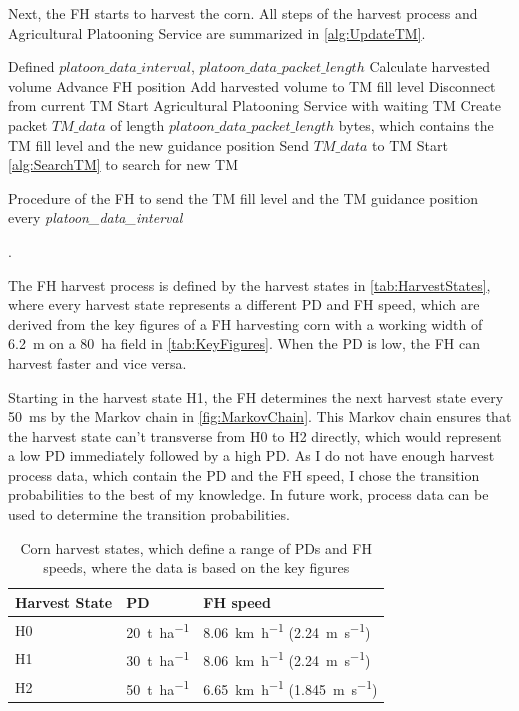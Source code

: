 Next, the \ac{FH} starts to harvest the corn.
All steps of the harvest process and Agricultural Platooning Service are summarized in
\autoref{alg:UpdateTM}.

\begin{algorithm}
\begin{algorithmic}[1]
\REQUIRE Defined $platoon\_data\_interval$, $platoon\_data\_packet\_length$
\STATE Calculate harvested volume
\STATE Advance \ac{FH} position
\STATE Add harvested volume to \ac{TM} fill level
    \STATE Disconnect from current \ac{TM}
	\STATE Start Agricultural Platooning Service with waiting \ac{TM}
\ELSE
	\STATE Create packet $TM\_data$ of length $platoon\_data\_packet\_length$ bytes, which contains the \ac{TM} fill level and the new guidance position
	\STATE Send $TM\_data$ to \ac{TM}
		\STATE Start \autoref{alg:SearchTM} to search for new \ac{TM}
	\ENDIF
\ENDIF
\end{algorithmic}
\caption{Procedure of the \acf{FH} to send the \acf{TM} fill level and the \ac{TM} guidance position every
\textit{platoon\_data\_interval}}.
\label{alg:UpdateTM}
\end{algorithm}

The FH harvest process is defined by the harvest states in \autoref{tab:HarvestStates},
where every harvest state represents a different \ac{PD} and \ac{FH} speed, which are derived from the key figures of a
\ac{FH} harvesting corn with a working width of \SI{6.2}{\meter} on a \SI{80}{\hectare} field in \autoref{tab:KeyFigures}.
When the \ac{PD} is low, the \ac{FH} can harvest faster and vice versa.

Starting in the harvest state H1, the \ac{FH} determines the next harvest state every \SI{50}{\milli\second}
by the Markov chain in \autoref{fig:MarkovChain}.
This Markov chain ensures that the harvest state can't transverse from H0 to H2 directly, which would represent
a low \ac{PD} immediately followed by a high \ac{PD}.
As I do not have enough harvest process data, which contain the \ac{PD} and the \ac{FH} speed,
I chose the transition probabilities to the best of my knowledge.
In future work, process data can be used to determine
the transition probabilities.

\begin{table}[H]
	\centering
	\begin{tabular}{>{\centering}p{2cm}p{4cm}p{4cm}}
		\toprule
		Harvest State & \ac{PD} & \ac{FH} speed\\
		\midrule
		H0 & \SI{20}{\tonne\per\hectare}
        & \SI{8.06}{\kilo\metre\per\hour} (\SI{2.24}{\metre\per\second}) \\
		H1 & \SI{30}{\tonne\per\hectare}
        & \SI{8.06}{\kilo\metre\per\hour} (\SI{2.24}{\metre\per\second}) \\
		H2 & \SI{50}{\tonne\per\hectare}
        & \SI{6.65}{\kilo\metre\per\hour} (\SI{1.845}{\metre\per\second}) \\
		\bottomrule
	\end{tabular}
	\caption{Corn harvest states, which define a range of \acf{PD}s and \acf{FH} speeds, where the data is based on the
	key figures \cite{faustzahlen2018}}
	\label{tab:markov_chain}
\end{table}

